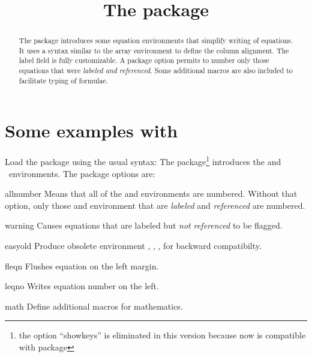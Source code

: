 \documentclass[a4paper]{article}
\title{The package \package{easyeqn}}
\begin{document}
\maketitle
\begin{abstract}
  The package  introduces some equation environments
  that simplify writing of equations.  It uses a syntax similar to the
  array environment to define the column alignment.  The label field
  is fully customizable.  A package option permits to number only
  those equations that were \emph{labeled and referenced}.  Some
  additional macros are also included to facilitate typing of
  formulae.
\end{abstract}

\tableofcontents
\clearpage

\pagestyle{fpage}
\def\sectionmark#1{\markboth{The package \package{easyeqn}}{The package \package{easyeqn}}}
\let\chaptermark\sectionmark
\let\subsectionmark\sectionmark

\section{Some examples with }
Load the package using the usual syntax:
%
%
The package\footnote{the option ``showkeys'' is eliminated in this
version because now  is compatible with 
 package}
introduces the  and ~environments.
The package options are:
\begin{dotlist}
\item[allnumber]
     Means that all of the  and 
     environments are numbered. Without that option, only
     those  and  environment that
     are \emph{labeled} and \emph{referenced} are numbered.
\item[warning]
     Causes equations that are labeled but \emph{not referenced}
     to be flagged.
\item[easyold]
     Produce obsolete environment , ,
     ,  for backward compatibilty.
\item[fleqn]
     Flushes equation on the left margin.
\item[leqno]
     Writes equation number on the left.
\item[math]
     Define additional macros for mathematics.
\end{dotlist}
 
\end{document}
